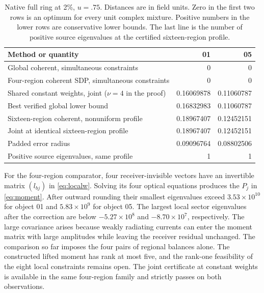 \documentclass[anonymous,12pt]{iopjournal}
\theoremstyle{remark}\newtheorem{remark}[theorem]{Remark}
\numberwithin{equation}{section}
\begin{document}
\begin{table}[tb]
\caption{Native full ring at 2\%, $u=.75$. Distances are in field units. Zero in the first two rows is an optimum for every unit complex mixture. Positive numbers in the lower rows are conservative lower bounds. The last line is the number of positive source eigenvalues at the certified sixteen-region profile.}\label{tab:compare}
\centering\begin{tabular}{@{}>{\raggedright\arraybackslash}p{.49\linewidth}rr@{}}\toprule
Method or quantity & 01 & 05\\ \midrule
Global coherent, simultaneous constraints &0&0\\
Four-region coherent SDP, simultaneous constraints &0&0\\
Shared constant weights, joint ($\nu=4$ in the proof) &0.16069878&0.11060787\\
Best verified global lower bound &0.16832983&0.11060787\\
Sixteen-region coherent, nonuniform profile &0.18967407&0.12452151\\
Joint at identical sixteen-region profile &0.18967407&0.12452151\\
Padded error radius &0.09096764&0.08802506\\
Positive source eigenvalues, same profile &1&1\\ \bottomrule
\end{tabular}
\end{table}

For the four-region comparator, four receiver-invisible vectors have an invertible matrix $(l_{bj})$ in \eqref{eq:localw}. Solving its four optical equations produces the $P_j$ in \eqref{eq:moment}. After outward rounding their smallest eigenvalues exceed $3.53\times10^{10}$ for object 01 and $5.83\times10^9$ for object 05. The largest local sector eigenvalues after the correction are below $-5.27\times10^8$ and $-8.70\times10^7$, respectively. The large covariance arises because weakly radiating currents can enter the moment matrix with large amplitudes while leaving the receiver residual unchanged. The comparison so far imposes the four pairs of regional balances alone. The constructed lifted moment has rank at most five, and the rank-one feasibility of the eight local constraints remains open. The joint certificate at constant weights is available in the same four-region family and strictly passes on both observations.
\end{document}

